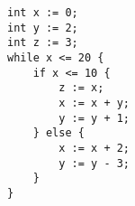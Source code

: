 \begin{lstlisting}[]  % Start your code-block
int x := 0;
int y := 2;
int z := 3;
while x <= 20 {
    if x <= 10 {
        z := x;
        x := x + y;
        y := y + 1;
    } else {
        x := x + 2;
        y := y - 3;
    }
}
	\end{lstlisting}